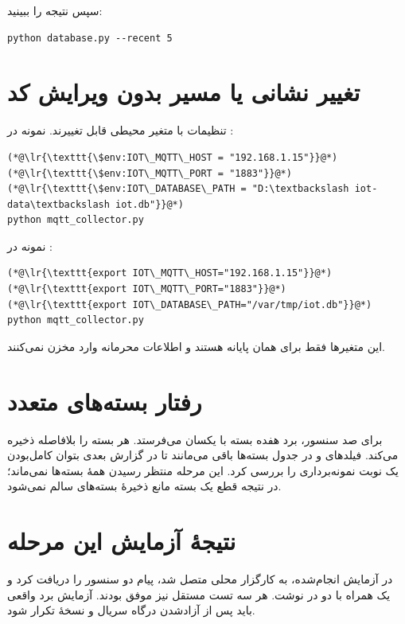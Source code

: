 سپس نتیجه را ببینید:

\begin{LTR}
\begin{lstlisting}
python database.py --recent 5
\end{lstlisting}
\end{LTR}

\section{تغییر نشانی یا مسیر بدون ویرایش کد}
تنظیمات با متغیر محیطی قابل تغییرند. نمونه در
:

\begin{LTR}
\begin{lstlisting}
(*@\lr{\texttt{\$env:IOT\_MQTT\_HOST = "192.168.1.15"}}@*)
(*@\lr{\texttt{\$env:IOT\_MQTT\_PORT = "1883"}}@*)
(*@\lr{\texttt{\$env:IOT\_DATABASE\_PATH = "D:\textbackslash iot-data\textbackslash iot.db"}}@*)
python mqtt_collector.py
\end{lstlisting}
\end{LTR}

نمونه در
:

\begin{LTR}
\begin{lstlisting}
(*@\lr{\texttt{export IOT\_MQTT\_HOST="192.168.1.15"}}@*)
(*@\lr{\texttt{export IOT\_MQTT\_PORT="1883"}}@*)
(*@\lr{\texttt{export IOT\_DATABASE\_PATH="/var/tmp/iot.db"}}@*)
python mqtt_collector.py
\end{lstlisting}
\end{LTR}

این متغیرها فقط برای همان پایانه هستند و اطلاعات محرمانه وارد مخزن نمی‌کنند.

\section{رفتار بسته‌های متعدد}
برای صد سنسور، برد هفده بسته با
یکسان می‌فرستد.
هر بسته را بلافاصله ذخیره می‌کند. فیلدهای
و
در جدول بسته‌ها باقی می‌مانند تا در گزارش بعدی بتوان کامل‌بودن یک نوبت نمونه‌برداری را بررسی کرد. این مرحله منتظر رسیدن همهٔ بسته‌ها نمی‌ماند؛ در نتیجه قطع یک بسته مانع ذخیرهٔ بسته‌های سالم نمی‌شود.

\section{نتیجهٔ آزمایش این مرحله}
در آزمایش انجام‌شده،
به کارگزار محلی متصل شد، پیام دو سنسور را دریافت کرد و یک
همراه با دو
در
نوشت. هر سه تست مستقل نیز موفق بودند. آزمایش برد واقعی باید پس از آزادشدن درگاه سریال و
نسخهٔ
تکرار شود.
